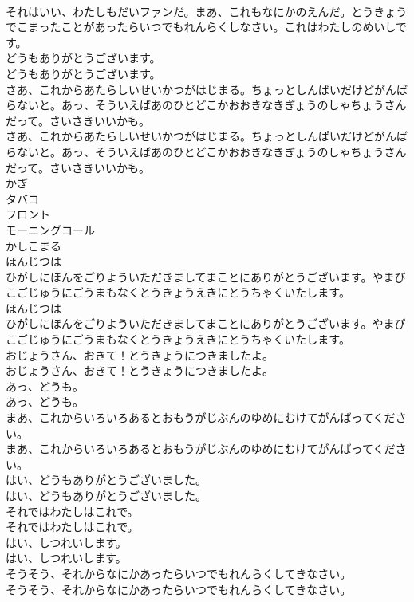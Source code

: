 \documentclass[8pt]{extreport}
\begin{document}
\begin{CJK}{UTF8}{min}
\\	それはいい、わたしもだいファンだ。まあ、これもなにかのえんだ。とうきょうでこまったことがあったらいつでもれんらくしなさい。これはわたしのめいしです。 
\\	どうもありがとうございます。	
\\	どうもありがとうございます。 
\\	さあ、これからあたらしいせいかつがはじまる。ちょっとしんぱいだけどがんばらないと。あっ、そういえばあのひとどこかおおきなきぎょうのしゃちょうさんだって。さいさきいいかも。	
\\	さあ、これからあたらしいせいかつがはじまる。ちょっとしんぱいだけどがんばらないと。あっ、そういえばあのひとどこかおおきなきぎょうのしゃちょうさんだって。さいさきいいかも。 
\\	かぎ
\\	タバコ
\\	フロント
\\	モーニングコール
\\	かしこまる
\\	ほんじつは
\\	ひがしにほんをごりよういただきましてまことにありがとうございます。やまびこごじゅうにごうまもなくとうきょうえきにとうちゃくいたします。	
\\	ほんじつは
\\	ひがしにほんをごりよういただきましてまことにありがとうございます。やまびこごじゅうにごうまもなくとうきょうえきにとうちゃくいたします。 
\\	おじょうさん、おきて！とうきょうにつきましたよ。	
\\	おじょうさん、おきて！とうきょうにつきましたよ。 
\\	あっ、どうも。	
\\	あっ、どうも。 
\\	まあ、これからいろいろあるとおもうがじぶんのゆめにむけてがんばってください。	
\\	まあ、これからいろいろあるとおもうがじぶんのゆめにむけてがんばってください。 
\\	はい、どうもありがとうございました。	
\\	はい、どうもありがとうございました。 
\\	それではわたしはこれで。	
\\	それではわたしはこれで。 
\\	はい、しつれいします。	
\\	はい、しつれいします。 
\\	そうそう、それからなにかあったらいつでもれんらくしてきなさい。	
\\	そうそう、それからなにかあったらいつでもれんらくしてきなさい。 

\end{CJK}
\end{document}
